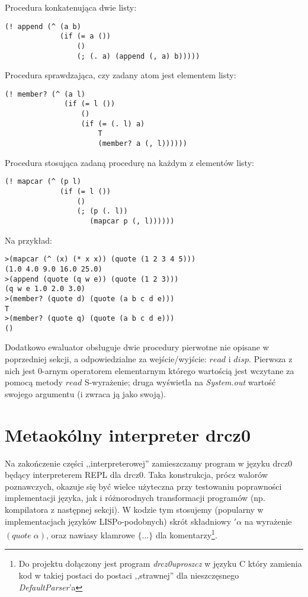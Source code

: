 \documentclass[a4paper]{article}
\begin{document}
Procedura konkatenująca dwie listy:
\begin{verbatim}
(! append (^ (a b)
             (if (= a ())
                 ()
                 (; (. a) (append (, a) b)))))
\end{verbatim}

Procedura sprawdzająca, czy zadany atom jest elementem listy:
\begin{verbatim}
(! member? (^ (a l)
              (if (= l ())
                  ()
                  (if (= (. l) a)
                      T
                      (member? a (, l))))))
\end{verbatim}

Procedura stosująca zadaną procedurę na każdym z elementów listy:
\begin{verbatim}
(! mapcar (^ (p l)
             (if (= l ())
                 ()
                 (; (p (. l))
                    (mapcar p (, l))))))
\end{verbatim}
\newpage
Na przykład:
\small
\begin{verbatim}
>(mapcar (^ (x) (* x x)) (quote (1 2 3 4 5)))
(1.0 4.0 9.0 16.0 25.0)
>(append (quote (q w e)) (quote (1 2 3)))
(q w e 1.0 2.0 3.0)
>(member? (quote d) (quote (a b c d e)))
T
>(member? (quote q) (quote (a b c d e)))
()
\end{verbatim}
\normalsize


Dodatkowo ewaluator obsługuje dwie procedury pierwotne nie opisane w poprzedniej sekcji, a odpowiedzialne
za wejście/wyjście: $read$ i $disp$. Pierwsza z nich jest 0-arnym operatorem elementarnym którego wartością
jest wczytane za pomocą metody $read$ S-wyrażenie; druga wyświetla na \emph{System.out} wartość swojego
argumentu (i zwraca ją jako swoją).


\section{Metaokólny interpreter drcz0}

Na zakończenie części ,,interpreterowej'' zamieszczamy program w języku drcz0 będący interpreterem
REPL dla drcz0. Taka konstrukcja, prócz walorów poznawczych, okazuje się być wielce użyteczna przy
testowaniu poprawności implementacji języka, jak i różnorodnych transformacji programów (np. kompilatora
z następnej sekcji).
W kodzie tym stosujemy (popularny w implementacjach języków LISPo-podobnych) skrót składniowy
$'\alpha$ na wyrażenie $(quote\; \alpha)$, oraz nawiasy klamrowe $\{...\}$ dla komentarzy\footnote{Do projektu
dołączony jest program \emph{drcz0uproszcz} w języku C który zamienia kod w takiej postaci do postaci ,,strawnej''
dla  nieszczęsnego \emph{DefaultParser}'a}.
\end{document}
